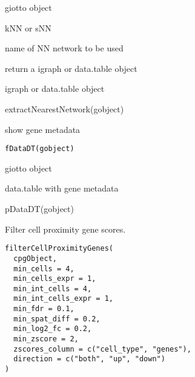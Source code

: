 \documentclass[a4paper]{book}
\begin{document}
%
\begin{Arguments}
\begin{ldescription}
\item[\code{gobject}] giotto object

\item[\code{nn\_network\_to\_use}] kNN or sNN

\item[\code{network\_name}] name of NN network to be used

\item[\code{output}] return a igraph or data.table object
\end{ldescription}
\end{Arguments}
%
\begin{Value}
igraph or data.table object
\end{Value}
%
\begin{Examples}
\begin{ExampleCode}
    extractNearestNetwork(gobject)
\end{ExampleCode}
\end{Examples}
%
\begin{Description}\relax
show gene metadata
\end{Description}
%
\begin{Usage}
\begin{verbatim}
fDataDT(gobject)
\end{verbatim}
\end{Usage}
%
\begin{Arguments}
\begin{ldescription}
\item[\code{gobject}] giotto object
\end{ldescription}
\end{Arguments}
%
\begin{Value}
data.table with gene metadata
\end{Value}
%
\begin{Examples}
\begin{ExampleCode}
    pDataDT(gobject)
\end{ExampleCode}
\end{Examples}
%
\begin{Description}\relax
Filter cell proximity gene scores.
\end{Description}
%
\begin{Usage}
\begin{verbatim}
filterCellProximityGenes(
  cpgObject,
  min_cells = 4,
  min_cells_expr = 1,
  min_int_cells = 4,
  min_int_cells_expr = 1,
  min_fdr = 0.1,
  min_spat_diff = 0.2,
  min_log2_fc = 0.2,
  min_zscore = 2,
  zscores_column = c("cell_type", "genes"),
  direction = c("both", "up", "down")
)
\end{verbatim}
\end{Usage}
\end{document}
